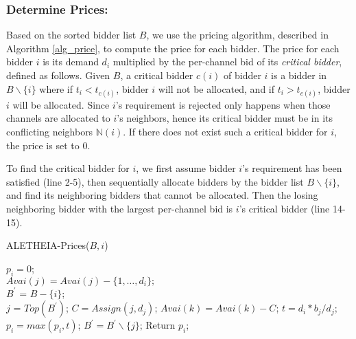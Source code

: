 \documentclass{sig-alternate}
\newtheorem{definition}{Definition}
\begin{document}
\subsubsection{Determine Prices:} Based on the sorted bidder list $B$, we use the pricing algorithm, described in Algorithm \ref{alg_price}, to compute the price for each bidder. %
The price for each bidder $i$ is its demand $d_i$ multiplied by the per-channel bid of its \emph{critical bidder}, defined as follows. Given $B$, a critical bidder $c(i)$ of bidder $i$ is a bidder in $B \backslash \{i\}$ where if $t_i < t_{c(i)}$, bidder $i$ will not be allocated, and if $t_i > t_{c(i)}$, bidder $i$ will be allocated. Since $i$'s requirement is rejected only happens when those channels are allocated to $i$'s neighbors, hence its critical bidder must be in its conflicting neighbors $\mathbb{N}(i)$.  If there does not exist such a critical bidder for $i$, the price is set to 0.


To find the critical bidder for $i$, we first assume bidder $i$'s requirement has been satisfied (line 2-5), then sequentially allocate bidders by the bidder list $B \backslash \{i\}$, and find its neighboring bidders that cannot be allocated. Then the losing neighboring bidder with the largest per-channel bid is $i$'s critical bidder (line 14-15).


{\renewcommand\baselinestretch{1}\selectfont
\begin{algorithm}[h]
    \caption{ALETHEIA-Prices($B, i$)}
    \label{alg_price}
    \begin{algorithmic}[1]
        \STATE $p_i = 0$;\\
            \STATE $Avai(j) = Avai(j)-\{1,\ldots, d_i\};$\\
        \ENDFOR
        \STATE $B^{'}$ = $B-\{i\}$;\\
            \STATE $j$ = $Top(B^{'})$;
                \STATE $C = Assign(j,d_j)$;
                    \STATE $Avai(k) = Avai(k) - C$;
                \ENDFOR
                \STATE $t = d_i*b_j/d_j$;
                \STATE $p_i = max(p_i, t)$;
            \ENDIF
            \STATE $B^{'} = B^{'} \backslash \{j\}$;
        \ENDWHILE
    \STATE Return $p_i$;
    \end{algorithmic}
\end{algorithm}
\par}
\end{document}
